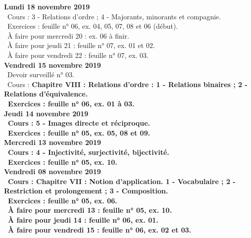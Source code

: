 \documentclass[12pt,a4paper]{article}
\begin{document}
\noindent\textbf{Lundi 18 novembre 2019}\\
\bu\ Cours : 3 - Relations d'ordre ;  4 - Majorants, minorants et compagnie.\\
\bu\ Exercices : feuille n° 06, ex. 04, 05, 07, 08 et 06 (début).\\ 
\bu\ À faire pour mercredi 20 : ex. 06 à finir.\\
\bu\ À faire pour jeudi 21 : feuille n° 07, ex. 01 et 02.\\
\bu\ À faire pour vendredi 22 : feuille n° 07, ex. 03.\vspace{.4cm}\\

\noindent\textbf{Vendredi 15 novembre 2019}\\
\bu\ Devoir surveillé n° 03.\\
\bu\ Cours : \bf Chapitre VIII \rm : Relations d'ordre : 1 - Relations binaires ; 2 - Relations d'équivalence.\\
\bu\ Exercices : feuille n° 06, ex. 01 à 03.\vspace{.4cm}\\

\noindent\textbf{Jeudi 14 novembre 2019}\\
\bu\ Cours : 5 - Images directe et réciproque.\\
\bu\ Exercices : feuille n° 05, ex. 05, 08 et 09.\vspace{.4cm}\\

\noindent\textbf{Mercredi 13 novembre 2019}\\
\bu\ Cours : 4 - Injectivité, surjectivité, bijectivité.\\
\bu\ Exercices : feuille n° 05, ex. 10.\vspace{.4cm}\\

\noindent\textbf{Vendredi 08 novembre 2019}\\
\bu\ Cours : \bf Chapitre VII \rm : Notion d'application. 1 - Vocabulaire ; 2 - Restriction et prolongement ; 3 - Composition.\\
\bu\ Exercices : feuille n° 05, ex. 06.\\
\bu\ À faire pour mercredi 13 : feuille n° 05, ex. 10.\\
\bu\ À faire pour jeudi 14 : feuille n° 06, ex. 01.\\
\bu\ À faire pour vendredi 15 : feuille n° 06, ex. 02 et 03.\vspace{.4cm}\\
\end{document}
